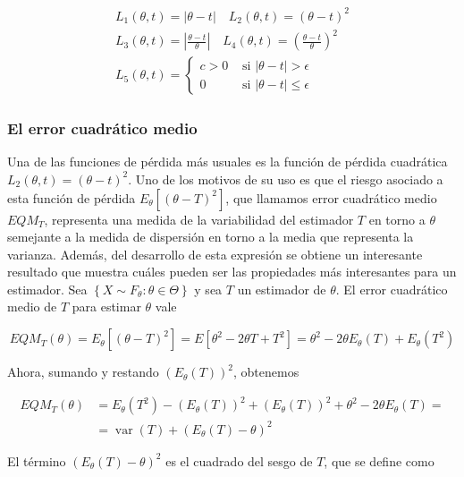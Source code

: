 \documentclass[
]{article}
\begin{document}
\[
\begin{gathered}
L_{1}(\theta, t)=|\theta-t| \quad L_{2}(\theta, t)=(\theta-t)^{2} \\
L_{3}(\theta, t)=\left|\frac{\theta-t}{\theta}\right| \quad L_{4}(\theta, t)=\left(\frac{\theta-t}{\theta}\right)^{2} \\
L_{5}(\theta, t)= \begin{cases}c>0 & \text { si }|\theta-t|>\epsilon \\
0 & \text { si }|\theta-t| \leq \epsilon\end{cases}
\end{gathered}
\]

\subsubsection{El error cuadrático medio}\label{el-error-cuadruxe1tico-medio}

Una de las funciones de pérdida más usuales es la función de pérdida cuadrática \(L_{2}(\theta, t)=(\theta-t)^{2}\). Uno de los motivos de su uso es que el riesgo asociado a esta función de pérdida \(E_{\theta}\left[(\theta-T)^{2}\right]\), que llamamos error cuadrático medio \(E Q M_{T}\), representa una medida de la variabilidad del estimador \(T\) en torno a \(\theta\) semejante a la medida de dispersión en torno a la media que representa la varianza.
Además, del desarrollo de esta expresión se obtiene un interesante resultado que muestra cuáles pueden ser las propiedades más interesantes para un estimador.
Sea \(\left\{X \sim F_{\theta}: \theta \in \Theta\right\}\) y sea \(T\) un estimador de \(\theta\). El error cuadrático medio de \(T\) para estimar \(\theta\) vale

\[
E Q M_{T}(\theta)=E_{\theta}\left[(\theta-T)^{2}\right]=E\left[\theta^{2}-2 \theta T+T^{2}\right]=\theta^{2}-2 \theta E_{\theta}(T)+E_{\theta}\left(T^{2}\right)
\]

Ahora, sumando y restando \(\left(E_{\theta}(T)\right)^{2}\), obtenemos

\[
\begin{aligned}
E Q M_{T}(\theta) & =E_{\theta}\left(T^{2}\right)-\left(E_{\theta}(T)\right)^{2}+\left(E_{\theta}(T)\right)^{2}+\theta^{2}-2 \theta E_{\theta}(T)= \\
& =\operatorname{var}(T)+\left(E_{\theta}(T)-\theta\right)^{2}
\end{aligned}
\]

El término \(\left(E_{\theta}(T)-\theta\right)^{2}\) es el cuadrado del sesgo de \(T\), que se define como
\end{document}
